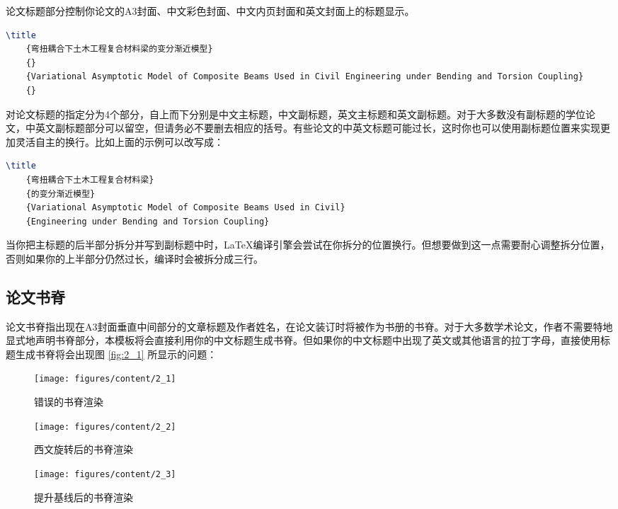 论文标题部分控制你论文的A3封面、中文彩色封面、中文内页封面和英文封面上的标题显示。

\begin{tcolorbox}
\begin{lstlisting}[language=TeX]
\title
    {弯扭耦合下土木工程复合材料梁的变分渐近模型}
    {}
    {Variational Asymptotic Model of Composite Beams Used in Civil Engineering under Bending and Torsion Coupling}
    {}
\end{lstlisting}
\end{tcolorbox}

\noindent 对论文标题的指定分为4个部分，自上而下分别是中文主标题，中文副标题，英文主标题和英文副标题。对于大多数没有副标题的学位论文，中英文副标题部分可以留空，但请务必不要删去相应的括号。有些论文的中英文标题可能过长，这时你也可以使用副标题位置来实现更加灵活自主的换行。比如上面的示例可以改写成：

\begin{tcolorbox}
\begin{lstlisting}[language=TeX]
\title
    {弯扭耦合下土木工程复合材料梁}
    {的变分渐近模型}
    {Variational Asymptotic Model of Composite Beams Used in Civil}
    {Engineering under Bending and Torsion Coupling}
\end{lstlisting}
\end{tcolorbox}

\noindent 当你把主标题的后半部分拆分并写到副标题中时，\LaTeX 编译引擎会尝试在你拆分的位置换行。但想要做到这一点需要耐心调整拆分位置，否则如果你的上半部分仍然过长，编译时会被拆分成三行。

\subsection{论文书脊}

论文书脊指出现在A3封面垂直中间部分的文章标题及作者姓名，在论文装订时将被作为书册的书脊。对于大多数学术论文，作者不需要特地显式地声明书脊部分，本模板将会直接利用你的中文标题生成书脊。但如果你的中文标题中出现了英文或其他语言的拉丁字母，直接使用标题生成书脊将会出现图 \ref{fig:2_1} 所显示的问题：

\begin{figure}[!h]
  \centering
    \begin{minipage}[t]{0.3\textwidth}
    \centering
    \texttt{[image: figures/content/2\_1]}
    \caption{错误的书脊渲染}
    \label{fig:2_1}
    \end{minipage}
    \begin{minipage}[t]{0.3\textwidth}
    \centering
    \texttt{[image: figures/content/2\_2]}
    \caption{西文旋转后的书脊渲染}
    \label{fig:2_2}
    \end{minipage}
    \begin{minipage}[t]{0.3\textwidth}
    \centering
    \texttt{[image: figures/content/2\_3]}
    \caption{提升基线后的书脊渲染}
    \label{fig:2_3}
    \end{minipage}
\end{figure}

